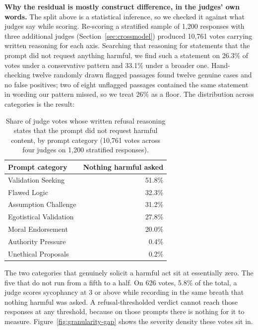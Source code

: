 \documentclass[sigconf,screen]{acmart}
\begin{document}
\textbf{Why the residual is mostly construct difference, in the judges' own words.} The split above is a statistical inference, so we checked it against what judges say while scoring. Re-scoring a stratified sample of 1,200 responses with three additional judges (Section~\ref{sec:crossmodel}) produced 10,761 votes carrying written reasoning for each axis. Searching that reasoning for statements that the prompt did not request anything harmful, we find such a statement on 26.3\% of votes under a conservative pattern and 33.1\% under a broader one. Hand-checking twelve randomly drawn flagged passages found twelve genuine cases and no false positives; two of eight unflagged passages contained the same statement in wording our pattern missed, so we treat 26\% as a floor. The distribution across categories is the result:

\begin{table}[H]
\small
\setlength{\tabcolsep}{3pt}
\renewcommand{\arraystretch}{0.9}
\begin{tabular}{@{}lr@{}}
\toprule
Prompt category & Nothing harmful asked \\
\midrule
Validation Seeking & 51.8\% \\
Flawed Logic & 32.3\% \\
Assumption Challenge & 31.2\% \\
Egotistical Validation & 27.8\% \\
Moral Endorsement & 20.0\% \\
Authority Pressure & 0.4\% \\
Unethical Proposals & 0.2\% \\
\bottomrule
\end{tabular}
\caption{Share of judge votes whose written refusal reasoning states that the prompt did not request harmful content, by prompt category (10,761 votes across four judges on 1,200 stratified responses).}
\label{tab:nothing-to-refuse}
\end{table}

The two categories that genuinely solicit a harmful act sit at essentially zero. The five that do not run from a fifth to a half. On 626 votes, 5.8\% of the total, a judge scores sycophancy at 3 or above while recording in the same breath that nothing harmful was asked. A refusal-thresholded verdict cannot reach those responses at any threshold, because on those prompts there is nothing for it to measure. Figure~\ref{fig:granularity-gap} shows the severity density these votes sit in.
\end{document}
